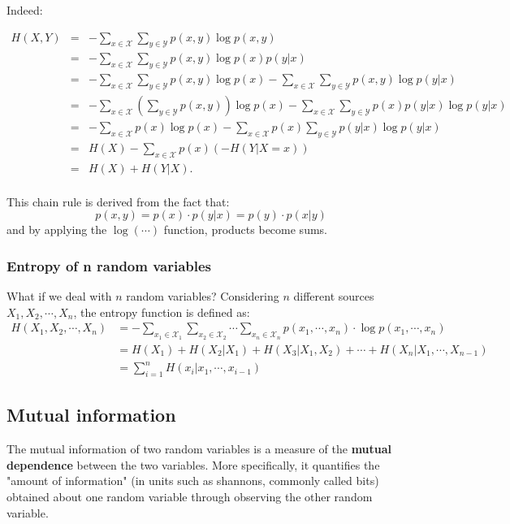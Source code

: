 \begin{itemize}
	Indeed:

	\begin{equation*}
		\begin{array}{rcl}
			H(X, Y) & = & -\sum_{x \in \mathcal{X}} \sum_{y \in \mathcal{Y}} p(x,y) \log p(x,y)\\[8pt]
			& = & - \sum_{x \in \mathcal{X}} \sum_{y \in \mathcal{Y}} p(x,y) \log p(x)p(y|x)\\[8pt]
			& = & - \sum_{x \in \mathcal{X}} \sum_{y \in \mathcal{Y}} p(x,y) \log p(x) - \sum_{x \in \mathcal{X}} \sum_{y \in \mathcal{Y}} p(x,y)\log p(y|x)\\[8pt]
			& = & - \sum_{x \in \mathcal{X}} \left(\sum_{y \in \mathcal{Y}} p(x, y)\right) \log{p(x)} - \sum_{x \in \mathcal{X}} \sum_{y \in \mathcal{Y}} p(x)p(y|x) \log{p(y|x)}\\[8pt]
			& = & - \sum_{x \in \mathcal{X}} p(x) \log{p(x)} - \sum_{x \in \mathcal{X}} p(x) \sum_{y \in \mathcal{Y}} p(y|x) \log{p(y|x)}\\[8pt]
			& = & H(X) - \sum_{x \in \mathcal{X}} p(x) (-H(Y|X=x))\\[8pt]
			& = & H(X) + H(Y|X).\\
		\end{array}
	\end{equation*}

	This chain rule is derived from the fact that:
	$$p(x,y) = p(x) \cdot p(y|x) = p(y) \cdot p(x|y)$$
	and by applying the $\log(\cdots)$ function, products become sums. 
\end{itemize} 

\subsubsection{Entropy of n random variables} What if we deal with $n$ random variables? Considering $n$ different sources $X_1, X_2, \cdots, X_n$, the entropy function is defined as:
\begin{equation*}
\begin{split}
H(X_1, X_2, \cdots, X_n) &= -\sum_{x_1 \in \mathcal{X}_1} \sum_{x_2 \in \mathcal{X}_2} \cdots \sum_{x_n \in \mathcal{X}_n} p(x_1, \cdots, x_n) \cdot \log p(x_1, \cdots, x_n)\\
&=H(X_1) + H(X_2|X_1) + H(X_3| X_1, X_2) + \cdots + H(X_n | X_1, \cdots, X_{n-1})\\
&=\sum_{i=1}^n H(x_i| x_1, \cdots, x_{i-1})
\end{split}
\end{equation*}

\subsection{Mutual information}
The mutual information of two random variables is a measure of the \textbf{mutual dependence} between the two variables. More specifically, it quantifies the "amount of information" (in units such as shannons, commonly called bits) obtained about one random variable through observing the other random variable.

